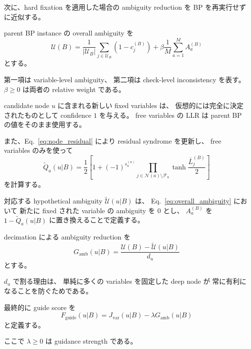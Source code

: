 次に、hard fixation を適用した場合の ambiguity reduction を
BP を再実行せずに近似する。

parent BP instance の overall ambiguity を
\begin{equation}
    \mathcal{U}(B)
    =
    \frac{1}{|\mathcal{U}_B|}
    \sum_{j\in\mathcal{U}_B}
    \left(1-c_j^{(B)}\right)
    +
    \beta
    \frac{1}{M}
    \sum_{a=1}^{M}
    A_a^{(B)}
    \label{eq:overall_ambiguity}
\end{equation}
とする。

第一項は variable-level ambiguity、
第二項は check-level inconsistency を表す。
$\beta\ge0$ は両者の relative weight である。

candidate node $u$ に含まれる新しい fixed variables は、
仮想的には完全に決定されたものとして confidence $1$ を与える。
free variables の LLR は parent BP の値をそのまま使用する。

また、Eq.~\eqref{eq:node_residual} により residual syndrome を更新し、
free variables のみを使って
\begin{equation}
    \widetilde Q_a(u|B)
    =
    \frac{1}{2}
    \left[
        1
        +
        (-1)^{s_a^{(u)}}
        \prod_{
            j\in\mathcal{N}(a)\setminus\mathcal{F}_u
        }
        \tanh\frac{\bar L_j^{(B)}}{2}
    \right]
\end{equation}
を計算する。

対応する hypothetical ambiguity
$\widetilde{\mathcal U}(u|B)$ は、
Eq.~\eqref{eq:overall_ambiguity} において
新たに fixed された variable の ambiguity を $0$ とし、
$A_a^{(B)}$ を
$1-\widetilde Q_a(u|B)$ に置き換えることで定義する。

decimation による ambiguity reduction を
\begin{equation}
    G_{\mathrm{amb}}(u|B)
    =
    \frac{
        \mathcal U(B)
        -
        \widetilde{\mathcal U}(u|B)
    }{
        d_u
    }
    \label{eq:ambiguity_gain}
\end{equation}
とする。

$d_u$ で割る理由は、
単純に多くの variables を固定した deep node が
常に有利になることを防ぐためである。

最終的に guide score を
\begin{equation}
    \boxed{
    F_{\mathrm{guide}}(u|B)
    =
    J_{\mathrm{var}}(u|B)
    -
    \lambda
    G_{\mathrm{amb}}(u|B)
    }
    \label{eq:fguide}
\end{equation}
と定義する。

ここで $\lambda\ge0$ は guidance strength である。

